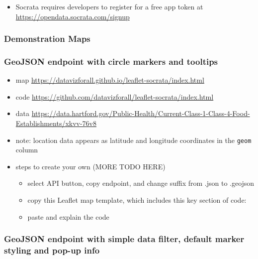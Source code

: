\documentclass[
  english,
]{book}
\providecommand{\tightlist}{%
  \setlength{\itemsep}{0pt}\setlength{\parskip}{0pt}}
\begin{document}
\begin{itemize}
\tightlist
\item
  Socrata requires developers to register for a free app token at \url{https://opendata.socrata.com/signup}
\end{itemize}

\hypertarget{demonstration-maps}{%
\subsubsection*{Demonstration Maps}\label{demonstration-maps}}

\hypertarget{geojson-endpoint-with-circle-markers-and-tooltips}{%
\subsubsection*{GeoJSON endpoint with circle markers and tooltips}\label{geojson-endpoint-with-circle-markers-and-tooltips}}

\begin{itemize}
\item
  map \url{https://datavizforall.github.io/leaflet-socrata/index.html}
\item
  code \url{https://github.com/datavizforall/leaflet-socrata/index.html}
\item
  data \url{https://data.hartford.gov/Public-Health/Current-Class-1-Class-4-Food-Establishments/xkvv-76v8}
\item
  note: location data appears as latitude and longitude coordinates in the \texttt{geom} column
\item
  steps to create your own (MORE TODO HERE)

  \begin{itemize}
  \item
    select API button, copy endpoint, and change suffix from .json to .geojson
  \item
    copy this Leaflet map template, which includes this key section of code:
  \item
    paste and explain the code
  \end{itemize}
\end{itemize}

\hypertarget{geojson-endpoint-with-simple-data-filter-default-marker-styling-and-pop-up-info}{%
\subsubsection*{GeoJSON endpoint with simple data filter, default marker styling and pop-up info}\label{geojson-endpoint-with-simple-data-filter-default-marker-styling-and-pop-up-info}}
\end{document}
